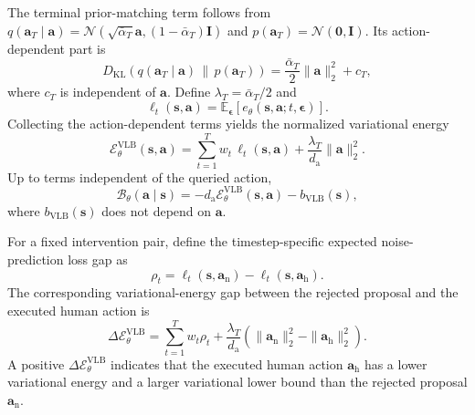 \documentclass[9pt,journal]{IEEEtran}
\newcommand{\E}{\mathbb{E}}
\newcommand{\Eelbo}{\ensuremath{\mathcal{E}_{\theta}^{\mathrm{VLB}}}}
\newcommand{\va}{\bm{a}}
\newcommand{\vs}{\bm{s}}
\newcommand{\veps}{\bm{\epsilon}}
\newcommand{\vah}{\ensuremath{\va_{\mathrm h}}}      %
\newcommand{\van}{\ensuremath{\va_{\mathrm n}}}      %
\begin{document}
The terminal prior-matching term follows from
$q(\va_T\mid\va)=
\mathcal N(\sqrt{\bar\alpha_T}\va,
(1-\bar\alpha_T)\bm I)$ and
$p(\va_T)=\mathcal N(\bm0,\bm I)$.
Its action-dependent part is
\begin{equation}
    D_{\mathrm{KL}}
    \left(
    q\!\left(\va_T\mid\va\right)
    \,\|\,
    p(\va_T)
    \right)
    =
    \frac{\bar\alpha_T}{2}\|\va\|_2^2+c_T,
    \label{eq:terminal_kl}
\end{equation}
where $c_T$ is independent of $\va$. Define
$\lambda_T=\bar\alpha_T/2$ and
\begin{equation*}
    \ell_t(\vs,\va)
    =
    \E_{\veps}
    \left[
    e_\theta\!\left(\vs,\va;t,\veps\right)
    \right].
\end{equation*}
Collecting the action-dependent terms yields the normalized variational energy
\begin{equation}
    \Eelbo(\vs,\va)
    =
    \sum_{t=1}^{T}
    w_t\,\ell_t(\vs,\va)
    +
    \frac{\lambda_T}{d_{\mathrm a}}
    \|\va\|_2^2.
    \label{eq:eelbo}
\end{equation}
Up to terms independent of the queried action,
\begin{equation}
    \mathcal B_\theta(\va\mid\vs)
    =
    -d_{\mathrm a}\Eelbo(\vs,\va)
    -
    b_{\mathrm{VLB}}(\vs),
    \label{eq:vlb_energy_relation}
\end{equation}
where $b_{\mathrm{VLB}}(\vs)$ does not depend on $\va$.

For a fixed intervention pair, define the timestep-specific expected noise-prediction loss gap as
\begin{equation*}
    \rho_t
    =
    \ell_t(\vs,\van)
    -
    \ell_t(\vs,\vah).
\end{equation*}
The corresponding variational-energy gap between the rejected proposal and the executed human action is
\begin{equation}
    \Delta\Eelbo
    =
    \sum_{t=1}^{T}w_t\rho_t
    +
    \frac{\lambda_T}{d_{\mathrm a}}
    \left(
    \|\van\|_2^2-\|\vah\|_2^2
    \right).
    \label{eq:vlb_gap_basic}
\end{equation}
A positive $\Delta\Eelbo$ indicates that the executed human action $\vah$ has a lower variational energy and
a larger variational lower bound than the rejected proposal $\van$.
\end{document}

